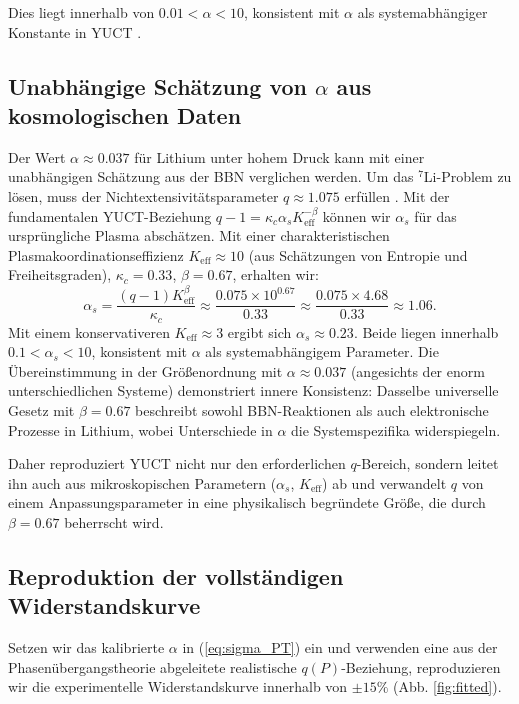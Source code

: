 \documentclass[12pt,a4paper]{article}
\theoremstyle{remark}
\newcommand{\Ke}{K_{\mathrm{eff}}}
\newcommand{\kappac}{\kappa_c}
\newcommand{\alp}{\alpha}
\begin{document}
	Dies liegt innerhalb von \(0.01 < \alp < 10\), konsistent mit \(\alp\) als systemabhängiger Konstante in YUCT \cite{appendixC}.
	
	\subsection{Unabhängige Schätzung von \(\alp\) aus kosmologischen Daten}
	\label{subsec:alpha_cosmo}
	
	Der Wert \(\alp \approx 0.037\) für Lithium unter hohem Druck kann mit einer unabhängigen Schätzung aus der BBN verglichen werden. Um das \(^7\)Li-Problem zu lösen, muss der Nichtextensivitätsparameter \(q \approx 1.075\) erfüllen \cite{bertulani2015}. Mit der fundamentalen YUCT-Beziehung \(q-1 = \kappac \alp_s \Ke^{-\beta}\) können wir \(\alp_s\) für das ursprüngliche Plasma abschätzen. Mit einer charakteristischen Plasmakoordinationseffizienz \(\Ke \approx 10\) (aus Schätzungen von Entropie und Freiheitsgraden), \(\kappac = 0.33\), \(\beta = 0.67\), erhalten wir:
	\[
	\alp_s = \frac{(q-1)\Ke^{\beta}}{\kappac} \approx \frac{0.075 \times 10^{0.67}}{0.33} \approx \frac{0.075 \times 4.68}{0.33} \approx 1.06.
	\]
	Mit einem konservativeren \(\Ke \approx 3\) ergibt sich \(\alp_s \approx 0.23\). Beide liegen innerhalb \(0.1 < \alp_s < 10\), konsistent mit \(\alp\) als systemabhängigem Parameter. Die Übereinstimmung in der Größenordnung mit \(\alp \approx 0.037\) (angesichts der enorm unterschiedlichen Systeme) demonstriert innere Konsistenz: Dasselbe universelle Gesetz mit \(\beta = 0.67\) beschreibt sowohl BBN-Reaktionen als auch elektronische Prozesse in Lithium, wobei Unterschiede in \(\alp\) die Systemspezifika widerspiegeln.
	
	Daher reproduziert YUCT nicht nur den erforderlichen \(q\)-Bereich, sondern leitet ihn auch aus mikroskopischen Parametern (\(\alp_s\), \(\Ke\)) ab und verwandelt \(q\) von einem Anpassungsparameter in eine physikalisch begründete Größe, die durch \(\beta = 0.67\) beherrscht wird.
	
	\subsection{Reproduktion der vollständigen Widerstandskurve}
	
	Setzen wir das kalibrierte \(\alp\) in (\ref{eq:sigma_PT}) ein und verwenden eine aus der Phasenübergangstheorie abgeleitete realistische \(q(P)\)-Beziehung, reproduzieren wir die experimentelle Widerstandskurve innerhalb von \(\pm 15\%\) (Abb. \ref{fig:fitted}).
	
\end{document}
